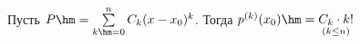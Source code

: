 
    Пусть $P\hm=\sum\limits_{k\hm=0}^nC_k(x-x_0)^k$. Тогда $p^{(k)}(x_0)\hm=\underset{(k\leq n)}{C_k\cdot k!}$
